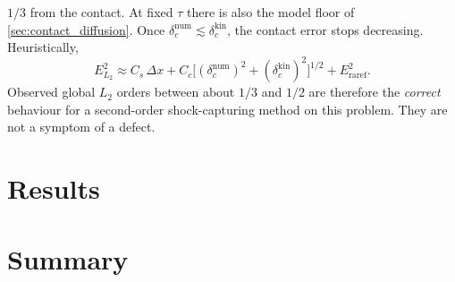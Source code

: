 \documentclass[11pt]{article}
\theoremstyle{remark}
\begin{document}
$1/3$ from the contact.  At fixed $\tau$ there is also the model floor of
\cref{sec:contact_diffusion}.  Once $\delta_c^{\mathrm{num}}\lesssim\delta_c^{\mathrm{kin}}$,
the contact error stops decreasing.  Heuristically,
\begin{equation}
  E_{L_2}^2 \approx C_s\,\Delta x + C_c\bigl[(\delta_c^{\mathrm{num}})^2 + (\delta_c^{\mathrm{kin}})^2\bigr]^{1/2} + E_{\mathrm{raref}}^2 .
  \label{eq:error_model}
\end{equation}
Observed global $L_2$ orders between about $1/3$ and $1/2$ are therefore the
\emph{correct} behaviour for a second-order shock-capturing method on this problem.
They are not a symptom of a defect.

\section{Results}
\label{sec:results}



\section{Summary}
\label{sec:summary}



\appendix
\end{document}
